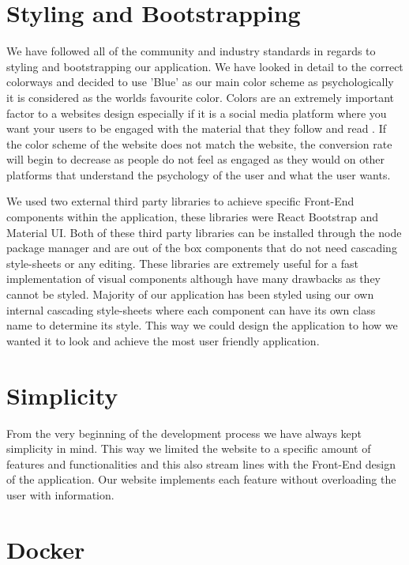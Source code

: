 \section{Styling and Bootstrapping}
We have followed all of the community and industry standards in regards to styling and bootstrapping our application. We have looked in detail to the correct colorways and decided to use 'Blue' as our main color scheme as psychologically it is considered as the worlds favourite color. Colors are an extremely important factor to a websites design especially if it is a social media platform where you want your users to be engaged with the material that they follow and read \cite{singh2011impact}. If the color scheme of the website does not match the website, the conversion rate will begin to decrease as people do not feel as engaged as they would on other platforms that understand the psychology of the user and what the user wants.

We used two external third party libraries to achieve specific Front-End components within the application, these libraries were React Bootstrap and Material UI. Both of these third party libraries can be installed through the node package manager and are out of the box components that do not need cascading style-sheets or any editing. These libraries are extremely useful for a fast implementation of visual components although have many drawbacks as they cannot be styled. Majority of our application has been styled using our own internal cascading style-sheets where each component can have its own class name to determine its style. This way we could design the application to how we wanted it to look and achieve the most user friendly application.

\section{Simplicity}
From the very beginning of the development process we have always kept simplicity in mind. This way we limited the website to a specific amount of features and functionalities and this also stream lines with the Front-End design of the application. Our website implements each feature without overloading the user with information.

\section{Docker}

